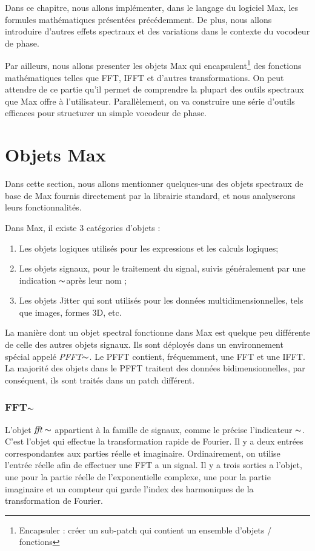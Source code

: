 
\label{ch:Design}

Dans ce chapitre, nous allons implémenter, dans le langage du logiciel Max, les formules mathématiques présentées précédemment. De plus, nous allons introduire d'autres effets spectraux et des variations dans le contexte du vocodeur de phase.

Par ailleurs, nous allons presenter les objets Max qui encapsulent\footnote{Encapsuler : créer un sub-patch qui contient un ensemble d'objets / fonctions } des fonctions mathématiques telles que FFT, IFFT et d’autres transformations. On peut attendre de ce partie qu'il permet de comprendre la plupart des outils spectraux que Max offre à l’utilisateur. Parallèlement, on va construire une série d’outils efficaces pour structurer un simple vocodeur de phase.

\section{Objets Max}

Dans cette section, nous allons mentionner quelques-uns des objets spectraux de base de Max fournis directement par la librairie standard, et nous analyserons leurs fonctionnalités.

Dans Max, il existe 3 catégories d’objets :
\begin{enumerate}
    \item
    Les objets logiques utilisés pour les expressions et les calculs logiques; 
    \item
    Les objets signaux, pour le traitement du signal, suivis généralement par une indication \guillemotleft$ \thicksim $\guillemotright après leur nom ; 
    \item
    Les objets Jitter qui sont utilisés pour les données multidimensionnelles, tels que images, formes 3D, etc.
\end{enumerate}

La manière dont un objet spectral fonctionne dans Max est quelque peu différente de celle des autres objets signaux. Ils sont déployés dans un environnement spécial appelé \textit{PFFT}$\thicksim $. Le PFFT contient, fréquemment, une FFT et une IFFT. La majorité des objets dans le PFFT traitent des données bidimensionnelles, par conséquent, ils sont traités dans un patch différent.

\subsubsection{FFT$\thicksim$}
    L'objet $ \textit{fft}\thicksim $ appartient à la famille de signaux, comme le précise l'indicateur $ \thicksim $. C'est l'objet qui effectue la transformation rapide de Fourier. Il y a deux entrées correspondantes aux parties réelle et imaginaire. Ordinairement, on utilise l'entrée réelle afin de effectuer une FFT a un signal. Il y a trois sorties a l'objet, une pour la partie réelle de l'exponentielle complexe, une pour la partie imaginaire et un compteur qui garde l’index des harmoniques de la transformation de Fourier.

